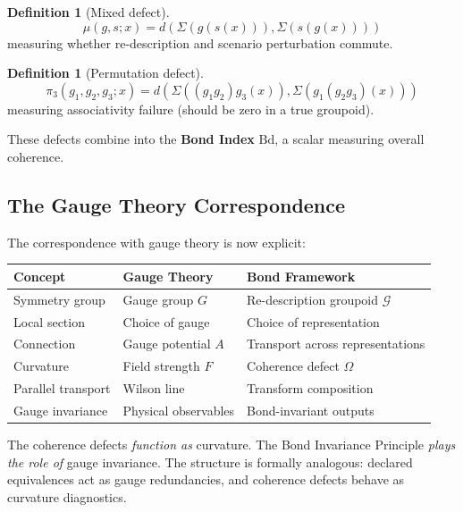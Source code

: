 \documentclass[12pt,letterpaper]{article}
\theoremstyle{definition}
\newtheorem{definition}[theorem]{Definition}
\theoremstyle{remark}
\newcommand{\G}{\mathcal{G}}
\begin{document}
\begin{definition}[Mixed defect]
\begin{equation}
\mu(g, s; x) = d(\Sigma(g(s(x))), \Sigma(s(g(x))))
\end{equation}
measuring whether re-description and scenario perturbation commute.
\end{definition}

\begin{definition}[Permutation defect]
\begin{equation}
\pi_3(g_1, g_2, g_3; x) = d(\Sigma((g_1 g_2) g_3(x)), \Sigma(g_1 (g_2 g_3)(x)))
\end{equation}
measuring associativity failure (should be zero in a true groupoid).
\end{definition}

These defects combine into the \textbf{Bond Index} $\text{Bd}$, a scalar measuring overall coherence.

\subsection{The Gauge Theory Correspondence}

The correspondence with gauge theory is now explicit:

\begin{center}
\begin{tabular}{lll}
\toprule
\textbf{Concept} & \textbf{Gauge Theory} & \textbf{Bond Framework} \\
\midrule
Symmetry group & Gauge group $G$ & Re-description groupoid $\G$ \\
Local section & Choice of gauge & Choice of representation \\
Connection & Gauge potential $A$ & Transport across representations \\
Curvature & Field strength $F$ & Coherence defect $\Omega$ \\
Parallel transport & Wilson line & Transform composition \\
Gauge invariance & Physical observables & Bond-invariant outputs \\
\bottomrule
\end{tabular}
\end{center}

The coherence defects \textit{function as} curvature. The Bond Invariance Principle \textit{plays the role of} gauge invariance. The structure is formally analogous: declared equivalences act as gauge redundancies, and coherence defects behave as curvature diagnostics.
\end{document}
